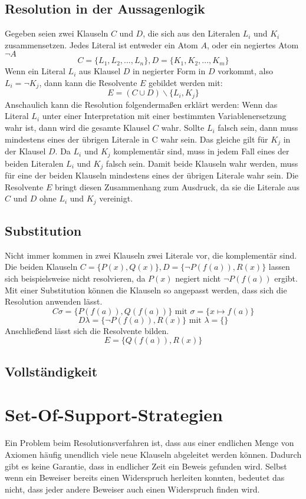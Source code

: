 		\subsection{Resolution in der Aussagenlogik}
Gegeben seien zwei Klauseln $C$ und $D$, die sich aus den Literalen $L_i$ und $K_i$ zusammensetzen. Jedes Literal ist entweder ein Atom $A$, oder ein negiertes Atom $\neg A$
$$C=\{L_1, L_2, ..., L_n\}, D=\{K_1, K_2, ..., K_m\}$$
Wenn ein Literal $L_i$ aus Klausel $D$ in negierter Form in $D$ vorkommt, also $L_i=\neg K_j$, dann kann die Resolvente $E$ gebildet werden mit:
$$E=(C \cup D) \backslash \{L_i, K_j\} $$
Anschaulich kann die Resolution folgendermaßen erklärt werden: 
Wenn das Literal $L_i$ unter einer Interpretation mit einer bestimmten Variablenersetzung wahr ist, dann wird die gesamte Klausel $C$ wahr. Sollte $L_i$ falsch sein, dann muss mindestens eines der übrigen Literale in C wahr sein.
Das gleiche gilt für $K_j$ in der Klausel $D$.
Da $L_i$ und $K_j$ komplementär sind, muss in jedem Fall eines der beiden Literalen $L_i$ und $K_j$ falsch sein. Damit beide Klauseln wahr werden, muss für eine der beiden Klauseln mindestens eines der übrigen Literale wahr sein. Die Resolvente $E$ bringt diesen Zusammenhang zum Ausdruck, da sie die Literale aus $C$ und $D$ ohne $L_i$ und $K_j$ vereinigt.

		\subsection{Substitution}
Nicht immer kommen in zwei Klauseln zwei Literale vor, die komplementär sind. Die beiden Klauseln $C=\{P(x), Q(x)\}, D=\{\neg P(f(a)), R(x)\}$ lassen sich beispielsweise nicht resolvieren, da $P(x)$ negiert nicht $\neg P(f(a))$ ergibt.
Mit einer Substitution können die Klauseln so angepasst werden, dass sich die Resolution anwenden lässt.
$$C\sigma=\{P(f(a)), Q(f(a))\} \text{ mit } \sigma=\{x \mapsto f(a)\}$$
$$D\lambda=\{\neg P(f(a)), R(x)\} \text{ mit } \lambda=\{\}$$
Anschließend lässt sich die Resolvente bilden.
$$E=\{Q(f(a)), R(x)\}$$
		\subsection{Vollständigkeit}
	
	\section{Set-Of-Support-Strategien}
Ein Problem beim Resolutionsverfahren ist, dass aus einer endlichen Menge von Axiomen häufig unendlich viele neue Klauseln abgeleitet werden können. Dadurch gibt es keine Garantie, dass in endlicher Zeit ein Beweis gefunden wird. Selbst wenn ein Beweiser bereits einen Widerspruch herleiten konnten, bedeutet das nicht, dass jeder andere Beweiser auch einen Widerspruch finden wird.


